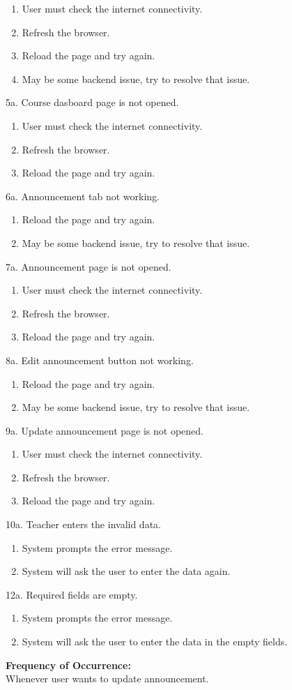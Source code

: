 \begin{enumerate}
\item User must check the internet connectivity.
\item Refresh the browser.
\item Reload the page and try again.
\item May be some backend issue, try to resolve that issue.
\end{enumerate}
5a. Course dasboard page is not opened.
\begin{enumerate}
\item User must check the internet connectivity.
\item Refresh the browser.
\item Reload the page and try again.
\end{enumerate}
6a. Announcement tab not working.
\begin{enumerate}
\item Reload the page and try again.
\item May be some backend issue, try to resolve that issue.
\end{enumerate}
7a. Announcement page is not opened.
\begin{enumerate}
\item User must check the internet connectivity.
\item Refresh the browser.
\item Reload the page and try again.
\end{enumerate}
8a. Edit announcement button not working.
\begin{enumerate}
\item Reload the page and try again.
\item May be some backend issue, try to resolve that issue.
\end{enumerate}
9a. Update announcement page is not opened.
\begin{enumerate}
\item User must check the internet connectivity.
\item Refresh the browser.
\item Reload the page and try again.
\end{enumerate}
10a. Teacher enters the invalid data.
\begin{enumerate}
\item System prompts the error message.
\item System will ask the user to enter the data again.
\end{enumerate}
12a. Required fields are empty.
\begin{enumerate}
\item System prompts the error message.
\item System will ask the user to enter the data in the empty fields.
\end{enumerate}
\textbf{Frequency of Occurrence:}\\
Whenever user wants to update announcement.



